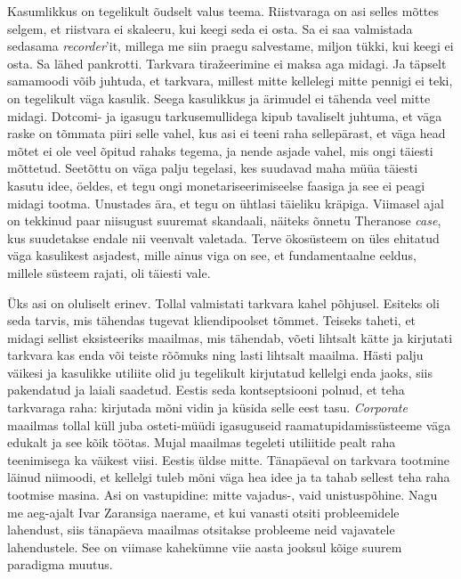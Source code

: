 
Kasumlikkus on tegelikult õudselt valus teema. Riistvaraga on  
asi selles mõttes selgem, et riistvara ei skaleeru, kui keegi seda ei osta. Sa 
ei 
saa valmistada sedasama \emph{recorder}'it, millega me siin praegu salvestame, 
miljon tükki, kui keegi ei osta. Sa lähed 
pankrotti. Tarkvara tiražeerimine ei maksa aga midagi. Ja täpselt samamoodi 
võib  
juhtuda, et tarkvara, millest mitte kellelegi mitte pennigi ei teki, on 
tegelikult väga kasulik. Seega kasulikkus ja ärimudel ei tähenda veel mitte 
midagi. Dotcomi- ja igasugu tarkusemullidega kipub tavaliselt juhtuma, et väga 
raske on tõmmata piiri selle vahel, kus asi ei teeni 
raha sellepärast, et väga head mõtet ei ole veel õpitud rahaks  
tegema, ja nende asjade vahel, mis ongi täiesti mõttetud. 
Seetõttu on väga palju tegelasi, kes suudavad maha müüa täiesti kasutu idee, 
öeldes, et tegu ongi monetariseerimiseelse faasiga ja see ei peagi midagi 
tootma. 
Unustades ära, et tegu on ühtlasi täieliku kräpiga. 
Viimasel ajal on tekkinud paar niisugust suuremat skandaali, näiteks
õnnetu Theranose \emph{case}, kus suudetakse endale nii veenvalt 
valetada. Terve ökosüsteem on üles ehitatud väga kasulikest 
asjadest, mille ainus viga on see, et fundamentaalne eeldus, millele süsteem 
rajati, oli täiesti vale. 


Üks asi on oluliselt erinev. Tollal valmistati tarkvara kahel põhjusel. 
Esiteks oli seda tarvis, mis tähendas tugevat kliendipoolset 
tõmmet. Teiseks taheti, et midagi sellist eksisteeriks 
maailmas, mis tähendab, võeti lihtsalt kätte ja kirjutati tarkvara kas enda 
või teiste rõõmuks ning lasti lihtsalt maailma. Hästi palju väikesi ja 
kasulikke 
utiliite olid ju tegelikult kirjutatud kellelgi 
enda jaoks, siis pakendatud ja laiali saadetud. Eestis seda kontseptsiooni 
polnud, et teha tarkvaraga 
raha: kirjutada mõni vidin ja küsida selle eest tasu. \emph{Corporate} maailmas 
tollal 
küll juba osteti-müüdi igasuguseid raamatupidamissüsteeme väga 
edukalt ja see kõik töötas. Mujal maailmas tegeleti utiliitide 
pealt raha teenimisega ka väikest viisi. Eestis üldse mitte. Tänapäeval on 
tarkvara tootmine läinud niimoodi, et kellelgi tuleb mõni väga
hea idee ja ta tahab sellest teha raha tootmise masina. Asi on vastupidine: 
mitte 
vajadus-, vaid unistuspõhine. Nagu me 
aeg-ajalt Ivar Zaransiga naerame, et kui vanasti 
otsiti probleemidele lahendust, siis tänapäeva 
maailmas otsitakse probleeme neid vajavatele lahendustele. See on viimase 
kahekümne viie aasta jooksul kõige suurem paradigma muutus.
